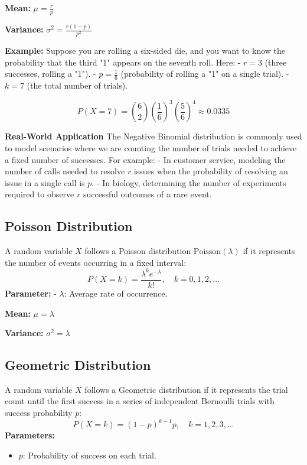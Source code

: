 \documentclass{article}
\begin{document}
\begin{multicols}{2}
\textbf{Mean:} \( \mu = \frac{r}{p} \)

\textbf{Variance:} \( \sigma^2 = \frac{r(1-p)}{p^2} \)

\textbf{Example:}
Suppose you are rolling a six-sided die, and you want to know the probability that the third "1" appears on the seventh roll. Here:
- \( r = 3 \) (three successes, rolling a "1").
- \( p = \frac{1}{6} \) (probability of rolling a "1" on a single trial).
- \( k = 7 \) (the total number of trials).

\[
P(X = 7) = \binom{6}{2}\left(\frac{1}{6}\right)^3\left(\frac{5}{6}\right)^4 \approx 0.0335
\]

\textbf{Real-World Application}
The Negative Binomial distribution is commonly used to model scenarios where we are counting the number of trials needed to achieve a fixed number of successes. For example:
- In customer service, modeling the number of calls needed to resolve \( r \) issues when the probability of resolving an issue in a single call is \( p \).
- In biology, determining the number of experiments required to observe \( r \) successful outcomes of a rare event.

\subsection*{Poisson Distribution}
A random variable \( X \) follows a Poisson distribution \( \text{Poisson}(\lambda) \) if it represents the number of events occurring in a fixed interval:
\[
P(X = k) = \frac{\lambda^k e^{-\lambda}}{k!}, \quad k = 0, 1, 2, \dots
\]
\textbf{Parameter:}
- \( \lambda \): Average rate of occurrence.

\textbf{Mean:} \( \mu = \lambda \)

\textbf{Variance:} \( \sigma^2 = \lambda \)

\subsection*{Geometric Distribution}
A random variable \( X \) follows a Geometric distribution if it represents the trial count until the first success in a series of independent Bernoulli trials with success probability \( p \):
\[
P(X = k) = (1 - p)^{k - 1}p, \quad k = 1, 2, 3, \dots
\]
\textbf{Parameters:}
\begin{itemize}
    \item \( p \): Probability of success on each trial.
\end{itemize}


\end{multicols}
\end{document}
